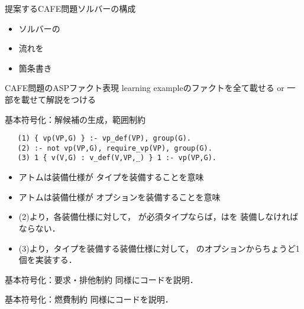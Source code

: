 \documentclass[dvipdfmx, 11pt]{beamer}
\begin{document}
 \begin{frame}{提案するCAFE問題ソルバーの構成}
  \scalebox{0.9}{%
  \centering
  
  }
  \begin{itemize}
   \item ソルバーの
   \item 流れを
   \item 箇条書き
  \end{itemize}
 \end{frame}
\begin{frame}{CAFE問題のASPファクト表現}
 learning exampleのファクトを全て載せる or 一部を載せて解説をつける
\end{frame}
\begin{frame}[fragile]{基本符号化：解候補の生成，範囲制約}
 \begin{exampleblock}{}
  \begin{lstlisting}
   (1) { vp(VP,G) } :- vp_def(VP), group(G). 
   (2) :- not vp(VP,G), require_vp(VP), group(G).
   (3) 1 { v(V,G) : v_def(V,VP,_) } 1 :- vp(VP,G).
  \end{lstlisting}
 \end{exampleblock}
 \begin{itemize}
  \item アトムは装備仕様が
   	タイプを装備することを意味
  \item アトムは装備仕様が
	オプションを装備することを意味
  \item (2)より，各装備仕様に対して，
	が必須タイプならば，はを
	装備しなければならない．
  \item (3)より，タイプを装備する装備仕様に対して，
	のオプションからちょうど1個を実装する．
  \end{itemize}
\end{frame}
\begin{frame}{基本符号化：要求・排他制約}
 同様にコードを説明．
\end{frame}
\begin{frame}{基本符号化：燃費制約}
 同様にコードを説明．
\end{frame}
\end{document}
